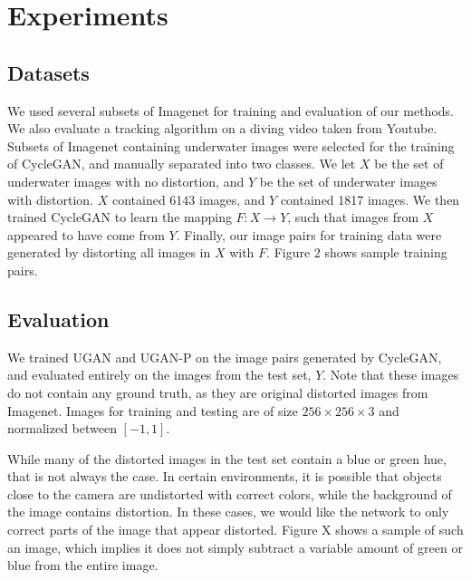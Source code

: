 \documentclass[conference,reqno]{IEEEtran}
\begin{document}
\section{Experiments}
\subsection{Datasets}
We used several subsets of Imagenet \cite{deng2009imagenet} for training and evaluation of our methods. We also
evaluate a tracking algorithm on a diving video taken from Youtube. Subsets of Imagenet containing underwater images
were selected for the training of CycleGAN, and manually separated into two classes. We let $X$ be the set of
underwater images with no distortion, and $Y$ be the set of underwater images with distortion. $X$ contained 6143
images, and $Y$ contained 1817 images. We then trained CycleGAN to learn the mapping $F: X \rightarrow Y$, such that
images from $X$ appeared to have come from $Y$. Finally, our image pairs for training data were generated by distorting
all images in $X$ with $F$. Figure 2 shows sample training pairs.

\subsection{Evaluation}
We trained UGAN and UGAN-P on the image pairs generated by CycleGAN, and evaluated entirely on the images from the
test set, $Y$. Note that these images do not contain any ground truth, as they are original distorted images from
Imagenet. Images for training and testing are of size $256 \times 256 \times 3$ and normalized between $[-1, 1]$.

While many of the distorted images in the test set contain a blue or green hue, that is not always the case. In certain
environments, it is possible that objects close to the camera are undistorted with correct colors, while the background
of the image contains distortion. In these cases, we would like the network to only correct parts of the image that
appear distorted. Figure X shows a sample of such an image, which implies it does not simply subtract a variable
amount of green or blue from the entire image.

\end{document}
